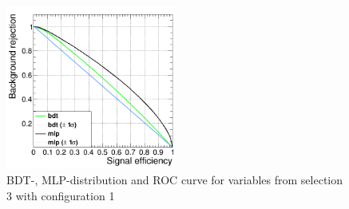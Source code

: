 \documentclass[11pt]{scrartcl}
\begin{document}
\begin{figure}[H]
\begin{minipage}{.5\textwidth}
	  \label{fig:distr_s3_config1_mlp}
	\end{minipage}
	\centering
	\includegraphics[width=0.5\textwidth]{figures/MVA/select3/config1/FOM_selection3_nL5_nT400_mD1_nC10.png}
	\caption{BDT-, MLP-distribution and ROC curve for variables from selection 3 with configuration 1}
	 \label{fig:ROC_s3_config1}
	\end{figure}
	
\end{document}
